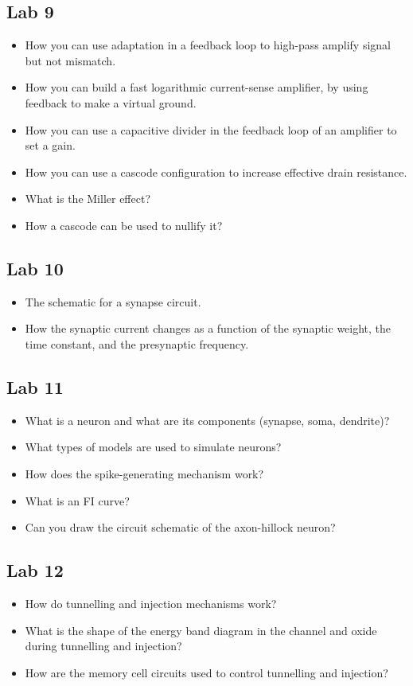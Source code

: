 \documentclass[main]{subfiles}
\begin{document}
\subsection{Lab 9}
\begin{itemize}
\item How you can use adaptation in a feedback loop to high-pass amplify signal but not mismatch.
\item How you can build a fast logarithmic current-sense amplifier, by using feedback to make a virtual ground. 
\item How you can use a capacitive divider in the feedback loop of an amplifier to set a gain. 
\item How you can use a cascode configuration to increase effective drain resistance.
\item What is the Miller effect?
\item How a cascode can be used to nullify it?
\end{itemize}


\subsection{Lab 10}
\begin{itemize}
\item The schematic for a synapse circuit. 
\item How the synaptic current changes as a function of the synaptic weight, the time constant, and the presynaptic frequency.
\end{itemize}


\subsection{Lab 11}
\begin{itemize}
\item What is a neuron and what are its components (synapse, soma, dendrite)? 
\item What types of models are used to simulate neurons? 
\item How does the spike-generating mechanism work?
\item What is an FI curve? 
\item Can you draw the circuit schematic of the axon-hillock neuron?
\end{itemize}


\subsection{Lab 12}
\begin{itemize}
\item How do tunnelling and injection mechanisms work? 
\item What is the shape of the energy band diagram in the channel and oxide during tunnelling and injection? 
\item How are the memory cell circuits used to control tunnelling and injection?
\end{itemize}
\end{document}
